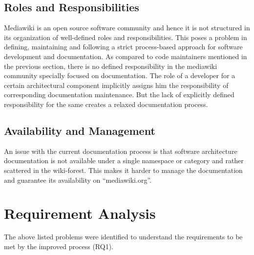 \subsection{Roles and Responsibilities}
\indent Mediawiki is an open source software community and hence it is not structured in its organization of well-defined roles and responsibilities. This poses a problem in defining, maintaining and following a strict process-based approach for software development and documentation. As compared to code maintainers mentioned in the previous section, there is no defined responsibility in the mediawiki community specially focused on documentation. The role of a developer for a certain architectural component implicitly assigns him the responsibility of corresponding documentation maintenance. But the lack of explicitly defined responsibility for the same creates a relaxed documentation process.
\subsection{Availability and Management}
\indent An issue with the current documentation process is that software architecture documentation is not available under a single namespace or category and rather scattered in the wiki-forest. This makes it harder to manage the documentation and guarantee its availability on \enquote{mediawiki.org}.
\section{Requirement Analysis}
\indent The above listed problems were identified to understand the requirements to be met by the improved process (RQ1).
